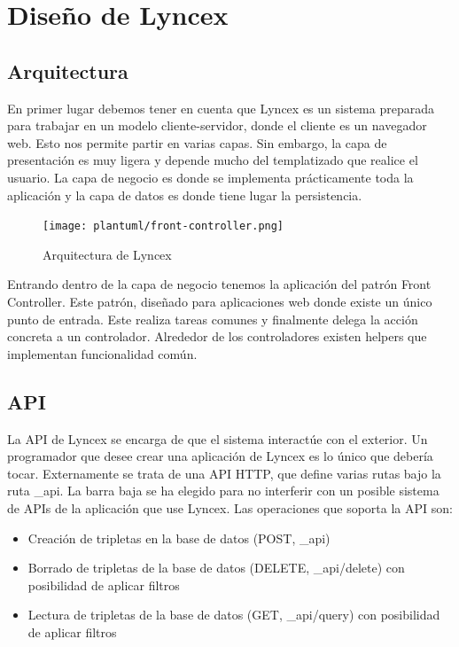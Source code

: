 \documentclass[12pt]{report} %
\begin{document}
\section{Diseño de Lyncex}

\subsection{Arquitectura}
En primer lugar debemos tener en cuenta que Lyncex es un sistema preparada para trabajar en un modelo cliente-servidor, donde el cliente es un navegador web. Esto nos permite partir en varias capas. Sin embargo, la capa de presentación es muy ligera y depende mucho del templatizado que realice el usuario. La capa de negocio es donde se implementa prácticamente toda la aplicación y la capa de datos es donde tiene lugar la persistencia.

\begin{figure}
    \centering
    \texttt{[image: plantuml/front-controller.png]}
    \caption{Arquitectura de Lyncex}
    \label{fig:arquitectura}
\end{figure}

Entrando dentro de la capa de negocio tenemos la aplicación del patrón Front Controller.
Este patrón, diseñado para aplicaciones web donde existe un único punto de entrada. Este realiza tareas comunes y finalmente delega la acción concreta a un controlador. Alrededor de los controladores existen helpers que implementan funcionalidad común.

\subsection{API}

La API de Lyncex se encarga de que el sistema interactúe con el exterior.
Un programador que desee crear una aplicación de Lyncex es lo único que debería tocar.
Externamente se trata de una API HTTP, que define varias rutas bajo la ruta \_api. La barra baja se ha elegido para no interferir con un posible sistema de APIs de la aplicación que use Lyncex.
Las operaciones que soporta la API son:
\begin{itemize}
    \item Creación de tripletas en la base de datos (POST, \_api)
    \item Borrado de tripletas de la base de datos (DELETE, \_api/delete) con posibilidad de aplicar filtros
    \item Lectura de tripletas de la base de datos (GET, \_api/query) con posibilidad de aplicar filtros
\end{itemize}
\end{document}
